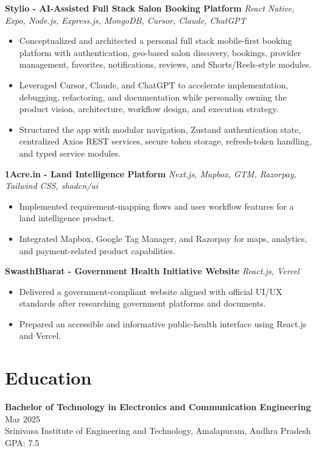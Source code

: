 \documentclass[10pt,a4paper]{article}
\newcommand{\resumeItem}[1]{\item #1}
\begin{document}
\textbf{Stylio - AI-Assisted Full Stack Salon Booking Platform} \hfill \textit{React Native, Expo, Node.js, Express.js, MongoDB, Cursor, Claude, ChatGPT}
\begin{itemize}
\resumeItem{Conceptualized and architected a personal full stack mobile-first booking platform with authentication, geo-based salon discovery, bookings, provider management, favorites, notifications, reviews, and Shorts/Reels-style modules.}
\resumeItem{Leveraged Cursor, Claude, and ChatGPT to accelerate implementation, debugging, refactoring, and documentation while personally owning the product vision, architecture, workflow design, and execution strategy.}
\resumeItem{Structured the app with modular navigation, Zustand authentication state, centralized Axios REST services, secure token storage, refresh-token handling, and typed service modules.}
\end{itemize}

\textbf{1Acre.in - Land Intelligence Platform} \hfill \textit{Next.js, Mapbox, GTM, Razorpay, Tailwind CSS, shadcn/ui}
\begin{itemize}
\resumeItem{Implemented requirement-mapping flows and user workflow features for a land intelligence product.}
\resumeItem{Integrated Mapbox, Google Tag Manager, and Razorpay for maps, analytics, and payment-related product capabilities.}
\end{itemize}

\textbf{SwasthBharat - Government Health Initiative Website} \hfill \textit{React.js, Vercel}
\begin{itemize}
\resumeItem{Delivered a government-compliant website aligned with official UI/UX standards after researching government platforms and documents.}
\resumeItem{Prepared an accessible and informative public-health interface using React.js and Vercel.}
\end{itemize}

\section{Education}
\textbf{Bachelor of Technology in Electronics and Communication Engineering} \hfill Mar 2025\\
Srinivasa Institute of Engineering and Technology, Amalapuram, Andhra Pradesh \hfill GPA: 7.5
\end{document}
